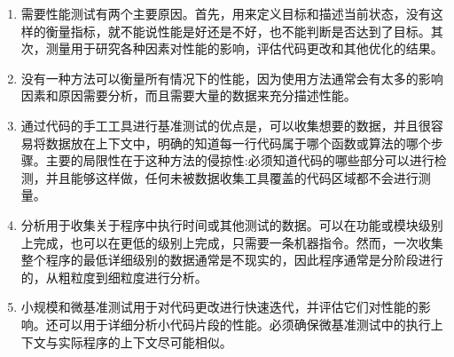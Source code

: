 \begin{enumerate}
\item 
需要性能测试有两个主要原因。首先，用来定义目标和描述当前状态，没有这样的衡量指标，就不能说性能是好还是不好，也不能判断是否达到了目标。其次，测量用于研究各种因素对性能的影响，评估代码更改和其他优化的结果。

\item 
没有一种方法可以衡量所有情况下的性能，因为使用方法通常会有太多的影响因素和原因需要分析，而且需要大量的数据来充分描述性能。

\item 
通过代码的手工工具进行基准测试的优点是，可以收集想要的数据，并且很容易将数据放在上下文中，明确的知道每一行代码属于哪个函数或算法的哪个步骤。主要的局限性在于这种方法的侵掠性:必须知道代码的哪些部分可以进行检测，并且能够这样做，任何未被数据收集工具覆盖的代码区域都不会进行测量。

\item
分析用于收集关于程序中执行时间或其他测试的数据。可以在功能或模块级别上完成，也可以在更低的级别上完成，只需要一条机器指令。然而，一次收集整个程序的最低详细级别的数据通常是不现实的，因此程序通常是分阶段进行的，从粗粒度到细粒度进行分析。

\item
小规模和微基准测试用于对代码更改进行快速迭代，并评估它们对性能的影响。还可以用于详细分析小代码片段的性能。必须确保微基准测试中的执行上下文与实际程序的上下文尽可能相似。
	
\end{enumerate}